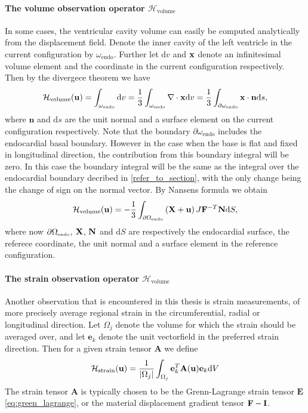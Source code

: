 \paragraph{The volume observation operator
  $\mathcal{H}_{\mathrm{volume}}$}
In some cases, the ventricular cavity volume can easily be computed
analytically from the displacement field. Denote the inner cavity of
the left ventricle in the current configuration by
$\omega_{\mathrm{endo}}$. Further let $\mathrm{d} v$ and $\mathbf{x}$
denote an infinitesimal volume element and the coordinate in the
current configuration respectively. Then by the divergece theorem we have
\begin{align}
  \mathcal{H}_{\mathrm{volume}}(\mathbf{u})= \int_{\omega_{\mathrm{endo}}} \mathrm{d} v =
  \frac{1}{3}\int_{\omega_{\mathrm{endo}}} \nabla \cdot \mathbf{x} \mathrm{d} v =
  \frac{1}{3}\int_{\partial \omega_{\mathrm{endo}}} \mathbf{x} \cdot \mathbf{n} \mathrm{d} s, 
\end{align}
where $\mathbf{n}$ and $\mathrm{d} s$ are the unit normal and a surface
element on the current configuration respectively.
Note that the boundary $\partial \omega_{\mathrm{endo}}$ includes the
endocardial basal boundary. However in the case when the base is flat
and fixed in longitudinal direction, the contribution from this
boundary integral will be zero. In this case the boundary integral
will be the same as the integral over the endocardial boundary
decribed in \ref{refer_to_section}, with the only change being the
change of sign on the normal vector. By Nansens formula we obtain
\begin{align}
  \mathcal{H}_{\mathrm{volume}}(\mathbf{u})= -\frac{1}{3}\int_{\partial \Omega_{ \textnormal{\tiny \text{endo}}}} \left( \mathbf{X} + \mathbf{u} \right) J \mathbf{F}^{-T} \mathbf{N} \mathrm{d}S,
  \label{eq:volume_operator}
\end{align}
where now $\partial \Omega_{ \textnormal{\tiny \text{endo}}}$,  $\mathbf{X}$, $\mathbf{N}$ and $\mathrm{d}S$ are respectively the
endocardial surface, the referece coordinate, the unit normal and a
surface element in the reference configuration.


\paragraph{The strain observation operator
  $\mathcal{H}_{\mathrm{volume}}$}
Another observation that is encountered in this thesis is strain
measurements, of more precisely average regional strain in the
circumferential, radial or longitudinal direction. Let $\Omega_j$
denote the volume for which the strain should be averaged over, and
let $\mathbf{e}_k$ denote the unit vectorfield in the preferred strain
direction. Then for a given strain tensor $\mathbf{A}$ we define 
\begin{align}
  \mathcal{H}_{\mathrm{strain}}(\mathbf{u}) = \frac{1}{|\Omega_j|}\int_{\Omega_j} \mathbf{e}_k^T \mathbf{A}(\mathbf{u}) \mathbf{e}_k  \mathrm{d}V
\end{align}
The strain tensor $ \mathbf{A}$ is typically chosen to be the
Grenn-Lagrange strain tensor $\mathbf{E}$\eqref{eq:green_lagrange}, or
the material displacement gradient tensor $\mathbf{F} - \mathbf{I}$.


